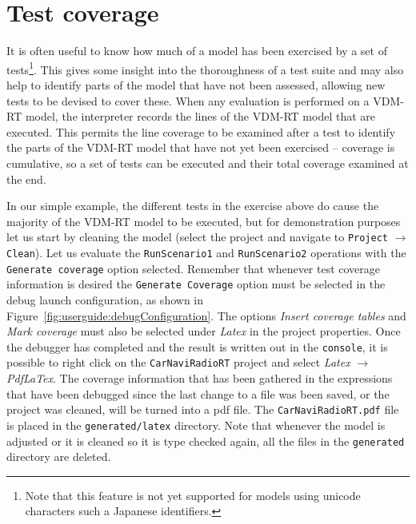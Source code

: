 
\section{Test coverage}\label{sec:testcov}

It is often useful to know how much of a model has been exercised by a
set of tests\footnote{Note that this feature is not yet supported for
  models using unicode characters such a Japanese identifiers.}. 
This gives some insight into the thoroughness of a test
suite and may also help to identify parts of the model that have not
been assessed, allowing new tests to be devised to cover these. When
any evaluation is performed on a VDM-RT model, the interpreter records
the lines of the VDM-RT model that are executed. This permits the line
coverage to be examined after a test to identify the parts of the
VDM-RT model that have not yet been exercised -- coverage is
cumulative, so a set of tests can be executed and their total coverage
examined at the end.

In our simple example, the different tests in the exercise above do
cause the majority of the VDM-RT model to be executed, but for
demonstration purposes let us start by cleaning the model (select the project and navigate to \texttt{Project} $\rightarrow$ \texttt{Clean}). Let us evaluate the
\texttt{RunScenario1} and \texttt{RunScenario2} operations with the
\texttt{Generate coverage} option selected. 
Remember that whenever test coverage
information is desired the \texttt{Generate Coverage} option
must be selected in the debug launch configuration, as shown in Figure~\ref{fig:userguide:debugConfiguration}.  The options \emph{Insert coverage tables} and \emph{Mark coverage} must also be selected under \emph{Latex} in the project properties.  Once the debugger
has completed and the result is written out in the \texttt{console}, it
is possible to right click on the \texttt{CarNaviRadioRT} project and
select \emph{Latex} $ \rightarrow $ \emph{PdfLaTex}.  The
coverage information that has been gathered in the expressions that
have been debugged since the last change to a file was been saved, or
the project was cleaned, will be turned into a pdf file. The
\texttt{CarNaviRadioRT.pdf} file is placed in the
\texttt{generated/latex} directory. Note that whenever the model is
adjusted or it is cleaned so it is type checked again, all the files
in the \texttt{generated} directory are deleted.

